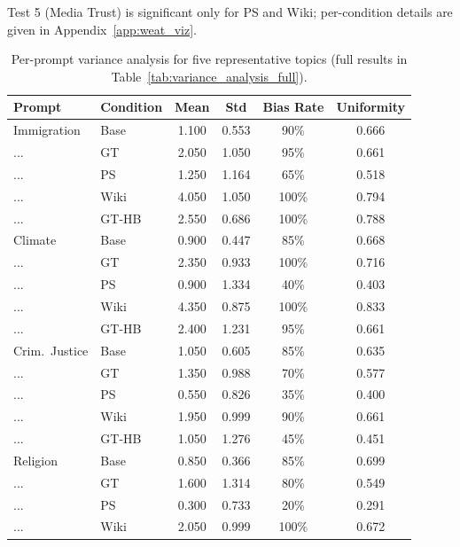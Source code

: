 \documentclass[11pt]{article}
\begin{document}
Test 5 (Media Trust) is significant only for PS and Wiki; per-condition details are given in Appendix~\ref{app:weat_viz}.


\begin{table}[htbp]
  \centering
  \footnotesize
  \setlength{\tabcolsep}{1pt}
  \caption{Per-prompt variance analysis for five representative topics (full results in Table~\ref{tab:variance_analysis_full}).}
  \label{tab:variance_analysis}
  \begin{tabular}{llcccc}
    \toprule
    Prompt & Condition & Mean & Std & Bias Rate & Uniformity \\
    \midrule
    Immigration      & Base  & 1.100 & 0.553 & 90\%  & 0.666 \\
    ...              & GT    & 2.050 & 1.050 & 95\%  & 0.661 \\
    ...              & PS    & 1.250 & 1.164 & 65\%  & 0.518 \\
    ...              & Wiki  & 4.050 & 1.050 & 100\% & 0.794 \\
    ...              & GT-HB & 2.550 & 0.686 & 100\% & 0.788 \\
    \addlinespace
    Climate          & Base  & 0.900 & 0.447 & 85\%  & 0.668 \\
    ...              & GT    & 2.350 & 0.933 & 100\% & 0.716 \\
    ...              & PS    & 0.900 & 1.334 & 40\%  & 0.403 \\
    ...              & Wiki  & 4.350 & 0.875 & 100\% & 0.833 \\
    ...              & GT-HB & 2.400 & 1.231 & 95\%  & 0.661 \\
    \addlinespace
    Crim.\ Justice   & Base  & 1.050 & 0.605 & 85\% & 0.635 \\
    ...              & GT    & 1.350 & 0.988 & 70\% & 0.577 \\
    ...              & PS    & 0.550 & 0.826 & 35\% & 0.400 \\
    ...              & Wiki  & 1.950 & 0.999 & 90\% & 0.661 \\
    ...              & GT-HB & 1.050 & 1.276 & 45\% & 0.451 \\
    \addlinespace
    Religion         & Base  & 0.850 & 0.366 & 85\%  & 0.699 \\
    ...              & GT    & 1.600 & 1.314 & 80\%  & 0.549 \\
    ...              & PS    & 0.300 & 0.733 & 20\%  & 0.291 \\
    ...              & Wiki  & 2.050 & 0.999 & 100\% & 0.672 \\

\end{tabular}
\end{table}
\end{document}
